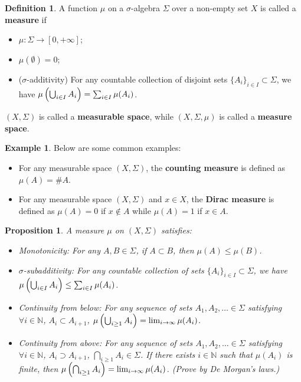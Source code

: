 \documentclass[openany]{book}
\newtheorem{proposition}{Proposition}[chapter]
\theoremstyle{definition}
\newtheorem{definition}{Definition}[chapter]
\newtheorem{example}{Example}[chapter]
\theoremstyle{remark}
\begin{document}
\begin{definition}
    A function $\mu$ on a $\sigma$-algebra $\Sigma$ over a non-empty set $X$ is called a \textbf{measure} if
    \begin{itemize}
        \item $\mu:\Sigma\rightarrow[0,+\infty]$;
        \item $\mu(\emptyset)=0$;
        \item ($\sigma$-additivity) For any countable collection of disjoint sets $\{A_i\}_{i\in I}\subset\Sigma$, we have $\mu\del{\bigcup_{i\in I}A_i}=\sum_{i\in I}\mu(A_i)$.
    \end{itemize}
    $(X,\Sigma)$ is called a \textbf{measurable space}, while $(X,\Sigma,\mu)$ is called a \textbf{measure space}.
\end{definition}
\begin{example}
    Below are some common examples:
    \begin{itemize}
        \item For any measurable space $(X,\Sigma)$, the \textbf{counting measure} is defined as $\mu(A)=\#A$.
        \item For any measurable space $(X,\Sigma)$ and $x\in X$, the \textbf{Dirac measure} is defined as $\mu(A)=0$ if $x\not\in A$ while $\mu(A)=1$ if $x\in A$.
    \end{itemize}
\end{example}
\begin{proposition}
    A measure $\mu$ on $(X,\Sigma)$ satisfies:
    \begin{itemize}
        \item Monotonicity: For any $A,B\in\Sigma$, if $A\subset B$, then $\mu(A)\le\mu(B)$.
        \item $\sigma$-subadditivity: For any countable collection of sets $\{A_i\}_{i\in I}\subset\Sigma$, we have $\mu\del{\bigcup_{i\in I}A_i}\le\sum_{i\in I}\mu(A_i)$.
        \item Continuity from below: For any sequence of sets $A_1,A_2,\ldots\in\Sigma$ satisfying $\forall i\in \mathbb{N}$, $A_i\subset A_{i+1}$, $\mu\del{\bigcup_{i\ge1}A_i}=\lim_{i\rightarrow\infty}\mu(A_i)$.
        \item Continuity from above: For any sequence of sets $A_1,A_2,\ldots\in\Sigma$ satisfying $\forall i\in \mathbb{N}$, $A_i\supset A_{i+1}$, $\bigcap_{i\ge1}A_i\in\Sigma$. If there exists $i\in \mathbb{N}$ such that $\mu(A_i)$ is finite, then $\mu\del{\bigcap_{i\ge1}A_i}=\lim_{i\rightarrow\infty}\mu(A_i)$. (Prove by De Morgan's laws.)
    \end{itemize}
\end{proposition}
\end{document}
